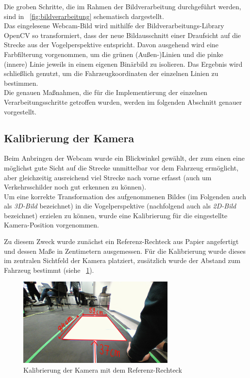 Die groben Schritte, die im Rahmen der Bildverarbeitung durchgef\"uhrt werden, sind in
\figurename\ \ref{fig:bildverarbeitung} schematisch dargestellt.\\
Das eingelesene Webcam-Bild wird mithilfe der Bildverarbeitungs-Library OpenCV\cite{OCV} so transformiert, dass
der neue Bildausschnitt einer Draufsicht auf die Strecke aus der Vogelperspektive entspricht.
Davon ausgehend wird eine Farbfilterung vorgenommen, um die gr\"unen (Au\ss en-)Linien und die
pinke (innere) Linie jeweils in einem eigenen Bin\"arbild zu isolieren. Das Ergebnis wird
schlie\ss lich genutzt, um die Fahrzeugkoordinaten der einzelnen Linien zu bestimmen.\\
Die genauen Ma\ss nahmen, die f\"ur die Implementierung der einzelnen Verarbeitungsschritte getroffen 
wurden, werden im folgenden Abschnitt genauer vorgestellt.


\subsection{Kalibrierung der Kamera}

Beim Anbringen der Webcam wurde ein Blickwinkel gew\"ahlt, der zum einen eine m\"oglichst gute Sicht auf die
Strecke unmittelbar vor dem Fahrzeug erm\"oglicht, aber gleichzeitig ausreichend viel Strecke nach
vorne erfasst (auch um Verkehrsschilder noch gut erkennen zu k\"onnen).\\
Um eine korrekte Transformation des aufgenommenen Bildes (im Folgenden auch als \textit{3D-Bild} bezeichnet)
in die Vogelperspektive (nachfolgend auch als \textit{2D-Bild} bezeichnet) erzielen zu
k\"onnen, wurde eine Kalibrierung f\"ur die eingestellte Kamera-Position vorgenommen.

Zu diesem Zweck wurde zun\"achst ein Referenz-Rechteck aus Papier angefertigt und dessen Ma\ss e
in Zentimetern ausgemessen.
F\"ur die Kalibrierung wurde dieses im zentralen Sichtfeld der Kamera platziert, zus\"atzlich wurde der
Abstand zum Fahrzeug bestimmt (siehe \figurename\ \ref{fig:testrechteck}).

\begin{figure}[h]
	\centering
	\includegraphics[width = 0.7\textwidth]{images/Testrechteck.png}
	\caption{Kalibrierung der Kamera mit dem Referenz-Rechteck}
	\label{fig:testrechteck}
\end{figure}

